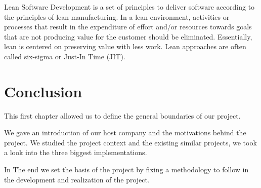 \begin{spacing}{1.2}
Lean Software Development is a set of principles to deliver software according to the principles of lean manufacturing. In a lean environment, activities or processes that result in the expenditure of effort and/or resources towards goals that are not producing value for the customer should be eliminated. Essentially, lean is centered on preserving value with less work. Lean approaches are often called six-sigma or Just-In Time (JIT).


\section*{Conclusion}

This first chapter allowed us to define the general boundaries of our project.

We gave an introduction of our host company and the motivations behind the project.
We studied the project context and the existing similar projects, we took a look into the three biggest implementations.

In The end we set the basis of the project by fixing a methodology to follow in the development and realization of the project.





\end{spacing}
